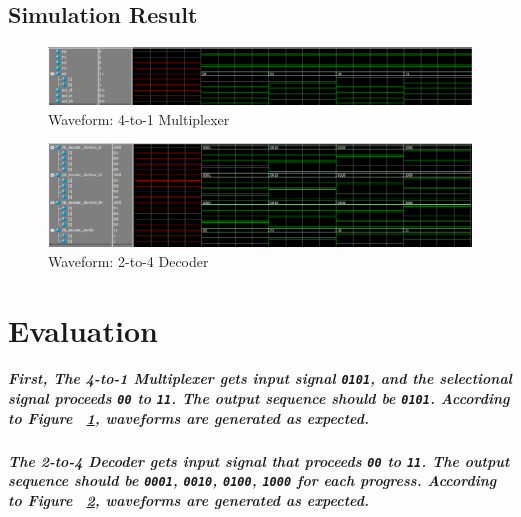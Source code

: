 \documentclass{report}
\begin{document}
        \section{Simulation Result}
            \begin{figure}[ht]
                \centering
                \includegraphics[width=\textwidth]{diagrams/waveform_mux.PNG}
                \caption{Waveform: 4-to-1 Multiplexer}
                \label{fig:waveform-mux}
            \end{figure} 
            
            \begin{figure}[ht]
                \centering
                \includegraphics[width=\textwidth]{diagrams/waveform_decoder.PNG}
                \caption{Waveform: 2-to-4 Decoder}
                \label{fig:waveform-decoder}
            \end{figure} 
    \chapter{Evaluation}
        \paragraph{\normalfont First, The 4-to-1 Multiplexer gets input signal \texttt{0101}, and the selectional signal proceeds \texttt{00} to \texttt{11}. The output sequence should be \texttt{0101}. According to Figure ~\ref{fig:waveform-mux}, waveforms are generated as expected.}

        \paragraph{\normalfont The 2-to-4 Decoder gets input signal that proceeds \texttt{00} to \texttt{11}. The output sequence should be \texttt{0001}, \texttt{0010}, \texttt{0100}, \texttt{1000} for each progress. According to Figure ~\ref{fig:waveform-decoder}, waveforms are generated as expected. }
\end{document}
